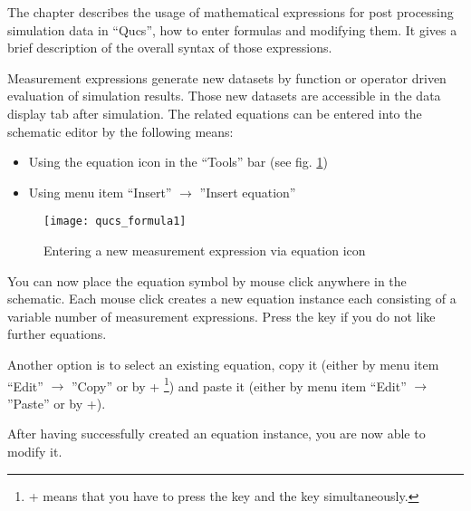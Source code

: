 \providecommand{\boldsymbol}[1]{\mbox{\boldmath $#1$}}

\providecommand{\tabularnewline}{\\}

The chapter describes the usage of mathematical expressions for post
processing simulation data in ``Qucs'', how to enter formulas and
modifying them.  It gives a brief description of the overall syntax of
those expressions.


Measurement expressions generate new datasets by function or operator
driven evaluation of simulation results. Those new datasets are
accessible in the data display tab after simulation. The related
equations can be entered into the schematic editor by the following
means:

\begin{itemize}
\item Using the equation icon in the {}``Tools'' bar (see fig. \ref{cap:Entering})
\item Using menu item {}``Insert'' $\rightarrow$ ''Insert equation''
\end{itemize}
%
\begin{figure}[ht]
\begin{center}\texttt{[image: qucs\_formula1]}\end{center}


\caption{\label{cap:Entering}Entering a new measurement expression via equation
icon}
\end{figure}


You can now place the equation symbol by mouse click anywhere in the
schematic. Each mouse click creates a new equation instance each
consisting of a variable number of measurement expressions.  Press the
\Esc key if you do not like further equations.

Another option is to select an existing equation, copy it (either
by menu item {}``Edit'' $\rightarrow$ ''Copy'' or by \Ctrl+%
\footnote{\Ctrl+ means that you have to press the \Ctrl key and the  key
simultaneously.%
}) and paste it (either by menu item {}``Edit''
$\rightarrow$ ''Paste'' or by \Ctrl+).

After having successfully created an equation instance, you are now
able to modify it.


